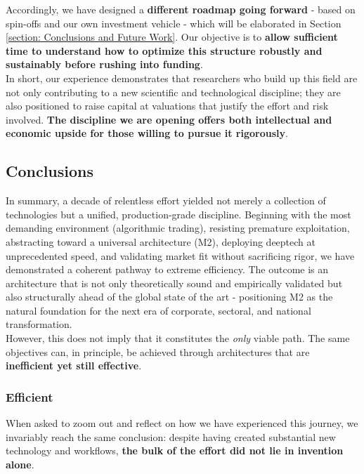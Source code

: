 \documentclass{article}
\begin{document}
Accordingly, we have designed a \textbf{different roadmap going forward} - based on spin-offs and our own investment vehicle - which will be elaborated in Section \ref{section: Conclusions and Future Work}. Our objective is to \textbf{allow sufficient time to understand how to optimize this structure robustly and sustainably before rushing into funding}.\\

In short, our experience demonstrates that researchers who build up this field are not only contributing to a new scientific and technological discipline; they are also positioned to raise capital at valuations that justify the effort and risk involved. \textbf{The discipline we are opening offers both intellectual and economic upside for those willing to pursue it rigorously}.\\

\subsection{Conclusions}
\label{subsection: Conclusions 6}
In summary, a decade of relentless effort yielded not merely a collection of technologies but a unified, production-grade discipline. Beginning with the most demanding environment (algorithmic trading), resisting premature exploitation, abstracting toward a universal architecture (M2), deploying deeptech at unprecedented speed, and validating market fit without sacrificing rigor, we have demonstrated a coherent pathway to extreme efficiency. The outcome is an architecture that is not only theoretically sound and empirically validated but also structurally ahead of the global state of the art - positioning M2 as the natural foundation for the next era of corporate, sectoral, and national transformation.\\

However, this does not imply that it constitutes the \textit{only} viable path. The same objectives can, in principle, be achieved through architectures that are \textbf{inefficient yet still effective}.\\

\subsubsection{Efficient}
\label{subsubsection: Efficient}
When asked to zoom out and reflect on how we have experienced this journey, we invariably reach the same conclusion: despite having created substantial new technology and workflows, \textbf{the bulk of the effort did not lie in invention alone}.\\
\end{document}
